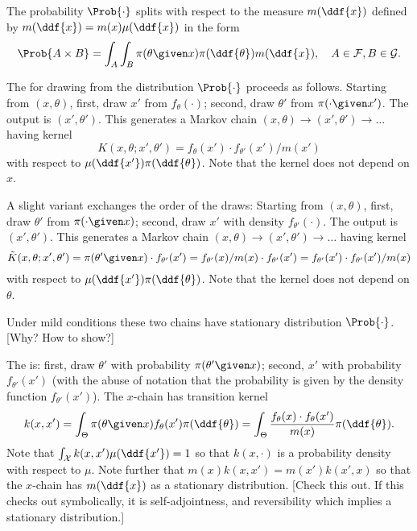 \documentclass[12pt]{article}
\begin{document}
The probability \( \Prob{\cdot} \) splits with respect to the measure \(
m(\ddf{x}) \) defined by \( m(\ddf{x}) = m(x) \mu(\ddf{x}) \) in the
form
\[
    \Prob{A \times B} = \int_A \int_{B} \pi(\theta \given x) \pi(\ddf{\theta})
    m(\ddf{x}), \quad A \in \mathcal{F}, B \in \mathcal{G}.
\]

The %
for drawing from the distribution \( \Prob{\cdot} \) proceeds as
follows.  Starting from \( (x, \theta) \), first, draw \( x' \) from \(
f_{\theta}(\cdot) \); second, draw \( \theta' \) from \( \pi(\cdot
\given x') \).  The output is \( (x' , \theta') \).  This generates a
Markov chain \( (x, \theta) \to (x', \theta') \to \dots \) having kernel
\[
    K(x, \theta; x', \theta') = f_{\theta}(x') \cdot f_{\theta'}(x')/m(x')
\] with respect to \( \mu(\ddf{x'})\pi(\ddf{\theta}) \).  Note that the
kernel does not depend on \( x \).

A slight variant exchanges the order of the draws:  Starting from \( (x,
\theta ) \), first, draw \( \theta' \) from \( \pi(\cdot \given x) \);
second, draw \( x' \) with density \( f_{\theta'}(\cdot) \).  The output
is \( (x', \theta' ) \).  This generates a Markov chain \( (x, \theta )
\to (x', \theta' ) \to \dots \) having kernel
\[
    \tilde{K}(x, \theta ; x' , \theta') = \pi( \theta' \given x) \cdot f_
    {\theta'}(x') = f_{\theta'}(x)/m(x) \cdot f_{\theta'}(x') = f_{\theta'}
    (x') \cdot f_{\theta'}(x')/m(x)
\] with respect to \( \mu(\ddf{x'})\pi(\ddf{\theta}) \).  Note that the
kernel does not depend on \( \theta \).

Under mild conditions these two chains have stationary distribution \(
\Prob{\cdot} \).  [Why?  How to show?]

The %
is:  first, draw \( \theta' \) with probability \( \pi(\theta' \given x)
\); second, \( x' \) with probability \( f_{\theta'}(x') \) (with the
abuse of notation that the probability is given by the density function \(
f_{\theta'}(x') \)).  The \( x \)-chain has transition kernel
\[
    k(x,x') = \int_{\Theta} \pi(\theta \given x) f_{\theta}(x') \pi(\ddf
    {\theta}) = \int_{\Theta} \frac{f_{\theta}(x) \cdot f_{\theta}(x')}{m
    (x)} \pi(\ddf {\theta}).
\] Note that \( \int_{\mathcal{X}} k(x,x') \mu(\ddf{x'}) = 1 \) so that \(
k(x,\cdot) \) is a probability density with respect to \( \mu \).  Note
further that \( m(x) k(x,x') = m(x') k(x',x) \) so that the \( x \)-chain
has \( m(\ddf{x}) \) as a stationary distribution.  [Check this out.  If
this checks out symbolically, it is self-adjointness, and reversibility
which implies a stationary distribution.]
\end{document}
